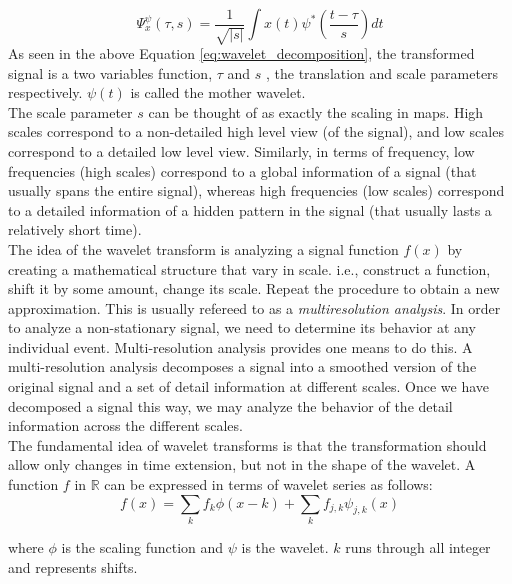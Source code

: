 \documentclass[12pt,english]{report}
\begin{document}
\begin{equation}
\Psi^{\psi}_{x}(\tau, s)=\frac{1}{\sqrt{|s|}}\int{x(t)\psi^*(\frac{t-\tau}{s})dt}
\label{eq:wavelet_decomposition}
\end{equation}
As seen in the above Equation \ref{eq:wavelet_decomposition}, the transformed signal is a two variables function, $\tau$ and $s$ , the translation and scale parameters respectively. $\psi(t)$ is called the mother wavelet.\\

The scale parameter $s$ can be thought of as exactly the scaling in maps. High scales correspond to a non-detailed high level view (of the signal), and low scales correspond to a detailed low level view. Similarly, in terms of frequency, low frequencies (high scales) correspond to a global information of a signal (that usually spans the entire signal), whereas high frequencies (low scales) correspond to a detailed information of a hidden pattern in the signal (that usually lasts a relatively short time).\\

The idea of the wavelet transform is analyzing a signal function $f(x)$ by creating a mathematical structure that vary in scale. i.e., construct a function, shift it by some amount, change its scale. Repeat the procedure to obtain a new approximation. This is usually refereed to as a \emph{multiresolution analysis}. In order to analyze a non-stationary signal, we need to determine its behavior at any individual event. Multi-resolution analysis provides one means to do this. A multi-resolution analysis decomposes a signal into a smoothed version of the original signal and a set of detail information at different scales. Once we have decomposed a signal this way, we may analyze the behavior of the detail information across the different scales.\\

The fundamental idea of wavelet transforms is that the transformation should allow only changes in time extension, but not in the shape of the wavelet. 
A function $f$ in $\mathbb{R}$ can be expressed in terms of wavelet series as follows:
\begin{equation}
f(x)=\sum\limits_{k}{f_k \phi(x-k)}+\sum\limits_{k}{f_{j,k}\psi_{j,k}(x)}
\end{equation}

where $\phi$ is the scaling function and $\psi$ is the wavelet. $k$ runs through all integer and represents shifts.\\
\end{document}
